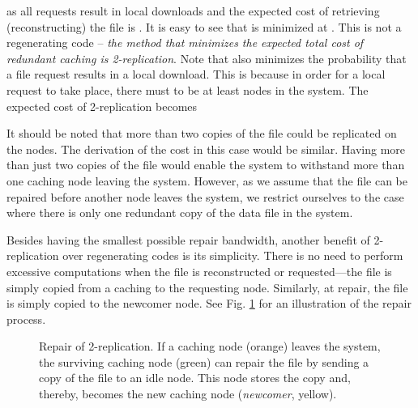 \documentclass[10pt,conference]{IEEEtran}
\begin{document}
as all requests result in local downloads and the expected cost of retrieving (reconstructing) the file is . It is easy to see that  is minimized at . This is not a regenerating code -- \emph{the method that minimizes the expected total cost of redundant caching is 2-replication}. Note that  also minimizes the probability that a file request results in a local download. This is because in order for a local request to take place, there must to be at least  nodes in the system. The expected cost of 2-replication becomes

It should be noted that more than two copies of the file could be replicated on the nodes. The derivation of the cost in this case would be similar. Having more than just two copies of the file would enable the system to withstand more than one caching node leaving the system. However, as we assume that the file can be repaired before another node leaves the system, we restrict ourselves to the case where there is only one redundant copy of the data file in the system.

Besides having the smallest possible repair bandwidth, another benefit of 2-replication over regenerating codes is its simplicity. There is no need to perform excessive computations when the file is reconstructed or requested---the file is simply copied from a caching to the requesting node. Similarly, at repair, the file is simply copied to the newcomer node. See Fig. \ref{failure} for an illustration of the repair process.

\begin{figure}[htb]
\centering
{}
\caption{Repair of 2-replication. If a caching node (orange) leaves the system, the surviving caching node (green) can repair the file by sending a copy of the file to an idle node. This node stores the copy and, thereby, becomes the new caching node (\emph{newcomer}, yellow).}
\label{failure}
\end{figure}
\end{document}
